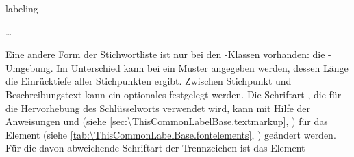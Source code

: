\begin{Declaration}
  \begin{Environment}{labeling}
    \begin{Body}
       \dots
      \BodyDots
    \end{Body}
  \end{Environment}
\end{Declaration}%
Eine andere Form der %
%
Stichwortliste ist nur bei den
{\KOMAScript}-Klassen %
%
vorhanden: die -Umgebung. Im Unterschied
 kann bei  ein Muster angegeben werden, dessen Länge
die Einrücktiefe aller Stichpunkten ergibt. Zwischen
Stichpunkt und Beschreibungstext kann ein optionales 
festgelegt werden. %
\BeginIndexGroup
{}%
%
%
Die Schriftart%
%
, die für die Hervorhebung des Schlüsselworts verwendet wird, kann mit Hilfe
der Anweisungen  und
 (siehe
\autoref{sec:\ThisCommonLabelBase.textmarkup},
) für das Element
 (siehe
\autoref{tab:\ThisCommonLabelBase.fontelements},
) geändert werden. Für die
davon abweichende Schriftart der Trennzeichen ist das Element
